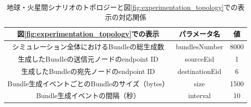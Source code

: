 \begin{table}[htbp]
    \centering
    \caption{地球・火星間シナリオのトポロジーと図\ref{fig:experimentation_topology}での表示の対応関係}
    \begin{tabular}{ccc}  \hline
        図\ref{fig:experimentation_topology}での表示 & パラメータ名 & 値 \\ \hline
        シミュレーション全体におけるBundleの総生成数 & bundlesNumber & 8000 \\
        生成したBundleの送信元ノードのendpoint ID & sourceEid & 1 \\
        生成したBundleの宛先ノードのendpoint ID & destinationEid & 6 \\
        Bundle生成イベントごとのBundleのサイズ（bytes）& size & 1500\\
        Bundle生成イベントの間隔（秒）& interval & 10 \\ \hline
    \end{tabular}
    \label{table:traffic_earth_mars}
\end{table}
